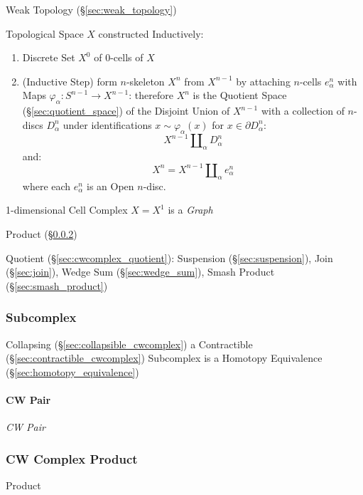 Weak Topology (\S\ref{sec:weak_topology})

Topological Space $X$ constructed Inductively: \cite{hatcher02}
\begin{enumerate}
  \item Discrete Set $X^0$ of $0$-cells of $X$
  \item (Inductive Step) form $n$-skeleton $X^n$ from $X^{n-1}$ by
    attaching $n$-cells $e^n_\alpha$ with Maps $\varphi_\alpha :
    S^{n-1} \rightarrow X^{n-1}$: therefore $X^n$ is the Quotient
    Space (\S\ref{sec:quotient_space}) of the Disjoint Union of
    $X^{n-1}$ with a collection of $n$-discs $D^n_\alpha$ under
    identifications $x \sim \varphi_\alpha(x)$ for $x \in \partial
    D^n_\alpha$:
    \[
      X^{n-1}\amalg_\alpha D^n_\alpha
    \]
    and:
    \[
      X^n = X^{n-1}\amalg_\alpha e^n_\alpha
    \]
    where each $e^n_\alpha$ is an Open $n$-disc.
\end{enumerate}

1-dimensional Cell Complex $X = X^1$ is a \emph{Graph}

Product (\S\ref{sec:cwcomplex_product})

Quotient (\S\ref{sec:cwcomplex_quotient}): Suspension
(\S\ref{sec:suspension}), Join (\S\ref{sec:join}), Wedge Sum
(\S\ref{sec:wedge_sum}), Smash Product (\S\ref{sec:smash_product})



\subsubsection{Subcomplex}\label{sec:subcomplex}

Collapsing (\S\ref{sec:collapsible_cwcomplex}) a Contractible
(\S\ref{sec:contractible_cwcomplex}) Subcomplex is a Homotopy
Equivalence (\S\ref{sec:homotopy_equivalence})



\paragraph{CW Pair}\label{sec:cw_pair}\hfill

\emph{CW Pair}



\subsubsection{CW Complex Product}\label{sec:cwcomplex_product}

Product



